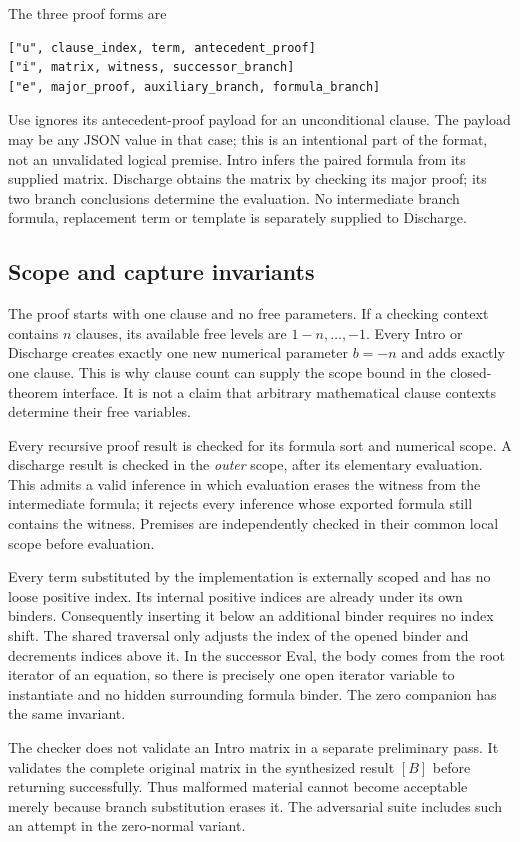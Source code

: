 \documentclass[11pt,letterpaper]{article}
\theoremstyle{definition}\newtheorem{definition}[theorem]{Definition}
\theoremstyle{remark}\newtheorem{remark}[theorem]{Remark}
\begin{document}
The three proof forms are
\begin{lstlisting}[language={}]
["u", clause_index, term, antecedent_proof]
["i", matrix, witness, successor_branch]
["e", major_proof, auxiliary_branch, formula_branch]
\end{lstlisting}
Use ignores its antecedent-proof payload for an unconditional clause. The
payload may be any JSON value in that case; this is an intentional part of
the format, not an unvalidated logical premise. Intro infers the paired
formula from its supplied matrix. Discharge obtains the matrix by checking
its major proof; its two branch conclusions determine the evaluation.
No intermediate branch formula, replacement term or template is separately
supplied to Discharge.

\subsection{Scope and capture invariants}

The proof starts with one clause and no free parameters. If a checking
context contains $n$ clauses, its available free levels are
$1-n,\ldots,-1$. Every Intro or Discharge creates exactly one new numerical
parameter $b=-n$ and adds exactly one clause. This is why clause count can
supply the scope bound in the closed-theorem interface. It is not a claim
that arbitrary mathematical clause contexts determine their free variables.

Every recursive proof result is checked for its formula sort and numerical
scope. A discharge result is checked in the \emph{outer} scope, after its
elementary evaluation. This admits a valid inference in which evaluation
erases the witness from the intermediate formula; it rejects every
inference whose exported formula still contains the witness. Premises
are independently checked in their common local scope before evaluation.

Every term substituted by the implementation is externally scoped and has
no loose positive index. Its internal positive indices are already under
its own binders. Consequently inserting it below an additional binder
requires no index shift. The shared traversal only adjusts the index of
the opened binder and decrements indices above it. In the successor Eval,
the body comes from the root iterator of an equation, so there is precisely
one open iterator variable to instantiate and no hidden surrounding formula
binder. The zero companion has the same invariant.

The checker does not validate an Intro matrix in a separate preliminary
pass. It validates the complete original matrix in the synthesized result
$[B]$ before returning successfully. Thus malformed material cannot become
acceptable merely because branch substitution erases it. The adversarial
suite includes such an attempt in the zero-normal variant.
\end{document}
